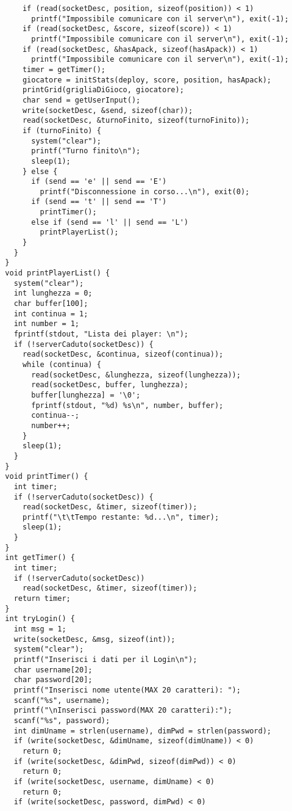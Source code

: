 \begin{lstlisting}
      if (read(socketDesc, position, sizeof(position)) < 1)
        printf("Impossibile comunicare con il server\n"), exit(-1);
      if (read(socketDesc, &score, sizeof(score)) < 1)
        printf("Impossibile comunicare con il server\n"), exit(-1);
      if (read(socketDesc, &hasApack, sizeof(hasApack)) < 1)
        printf("Impossibile comunicare con il server\n"), exit(-1);
      timer = getTimer();
      giocatore = initStats(deploy, score, position, hasApack);
      printGrid(grigliaDiGioco, giocatore);
      char send = getUserInput();
      write(socketDesc, &send, sizeof(char));
      read(socketDesc, &turnoFinito, sizeof(turnoFinito));
      if (turnoFinito) {
        system("clear");
        printf("Turno finito\n");
        sleep(1);
      } else {
        if (send == 'e' || send == 'E')
          printf("Disconnessione in corso...\n"), exit(0);
        if (send == 't' || send == 'T')
          printTimer();
        else if (send == 'l' || send == 'L')
          printPlayerList();
      }
    }
  }
  void printPlayerList() {
    system("clear");
    int lunghezza = 0;
    char buffer[100];
    int continua = 1;
    int number = 1;
    fprintf(stdout, "Lista dei player: \n");
    if (!serverCaduto(socketDesc)) {
      read(socketDesc, &continua, sizeof(continua));
      while (continua) {
        read(socketDesc, &lunghezza, sizeof(lunghezza));
        read(socketDesc, buffer, lunghezza);
        buffer[lunghezza] = '\0';
        fprintf(stdout, "%d) %s\n", number, buffer);
        continua--;
        number++;
      }
      sleep(1);
    }
  }
  void printTimer() {
    int timer;
    if (!serverCaduto(socketDesc)) {
      read(socketDesc, &timer, sizeof(timer));
      printf("\t\tTempo restante: %d...\n", timer);
      sleep(1);
    }
  }
  int getTimer() {
    int timer;
    if (!serverCaduto(socketDesc))
      read(socketDesc, &timer, sizeof(timer));
    return timer;
  }
  int tryLogin() {
    int msg = 1;
    write(socketDesc, &msg, sizeof(int));
    system("clear");
    printf("Inserisci i dati per il Login\n");
    char username[20];
    char password[20];
    printf("Inserisci nome utente(MAX 20 caratteri): ");
    scanf("%s", username);
    printf("\nInserisci password(MAX 20 caratteri):");
    scanf("%s", password);
    int dimUname = strlen(username), dimPwd = strlen(password);
    if (write(socketDesc, &dimUname, sizeof(dimUname)) < 0)
      return 0;
    if (write(socketDesc, &dimPwd, sizeof(dimPwd)) < 0)
      return 0;
    if (write(socketDesc, username, dimUname) < 0)
      return 0;
    if (write(socketDesc, password, dimPwd) < 0)

\end{lstlisting}

